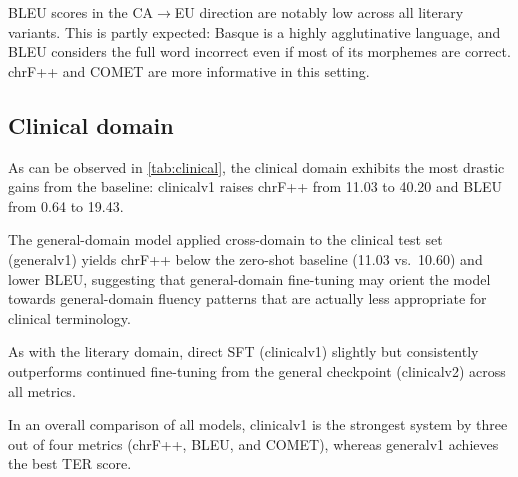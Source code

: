 \documentclass[11pt,a4paper]{article}
\begin{document}
BLEU scores in the CA$\to$EU direction are notably low across all
literary variants. This is partly expected: Basque is a highly
agglutinative language, and BLEU considers the full word incorrect even if most of its morphemes are correct. 
chrF++ and COMET are more informative in this
setting.

\subsection{Clinical domain}

\begin{table}[H]
\small
\centering
{}
\caption{Clinical domain results (CA$\to$EU only). Bold: best value per metric.}
\label{tab:clinical}
\end{table}

As can be observed in \autoref{tab:clinical}, the clinical domain exhibits the most drastic gains from the baseline: clinicalv1
raises chrF++ from 11.03 to 40.20 and BLEU from 0.64 to 19.43.


The general-domain model applied cross-domain to the clinical
test set (generalv1) yields chrF++ below the zero-shot baseline
(11.03 vs.\ 10.60) and lower BLEU, suggesting that general-domain
fine-tuning may orient the model towards general-domain fluency patterns
that are actually less appropriate for clinical terminology. 

As with the literary domain, direct SFT (clinicalv1) slightly but consistently outperforms
continued fine-tuning from the general checkpoint (clinicalv2) across all metrics.


In an overall comparison of all models, clinicalv1 is the strongest system by three out of four metrics (chrF++, BLEU, and COMET), whereas generalv1 achieves the best TER score.
\end{document}
